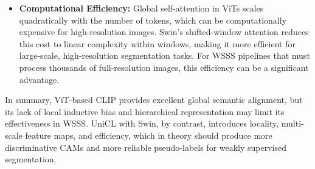 \begin{itemize}
    \item \textbf{Computational Efficiency:}  
    Global self-attention in ViTs scales quadratically with the number of tokens, which can be computationally expensive for high-resolution images. Swin's shifted-window attention reduces this cost to linear complexity within windows, making it more efficient for large-scale, high-resolution segmentation tasks. For WSSS pipelines that must process thousands of full-resolution images, this efficiency can be a significant advantage.
\end{itemize}

In summary, ViT-based CLIP provides excellent global semantic alignment, but its lack of local inductive bias and hierarchical representation may limit its effectiveness in WSSS. UniCL with Swin, by contrast, introduces locality, multi-scale feature maps, and efficiency, which in theory should produce more discriminative CAMs and more reliable pseudo-labels for weakly supervised segmentation.